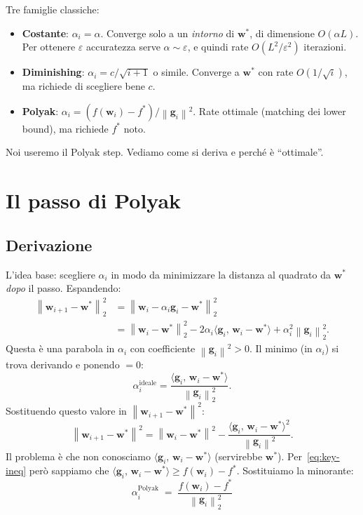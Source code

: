 \documentclass[11pt,a4paper]{article}
\newcommand{\norm}[1]{\left\|#1\right\|}
\newcommand{\inner}[2]{\langle #1,\,#2\rangle}
\newcommand{\bw}{\mathbf{w}}
\newcommand{\bg}{\mathbf{g}}
\theoremstyle{definition}
\begin{document}
Tre famiglie classiche:

\begin{itemize}[leftmargin=*]
\item \textbf{Costante}: $\alpha_i = \alpha$. Converge solo a un \emph{intorno} di $\bw^*$, di dimensione $O(\alpha L)$. Per ottenere $\varepsilon$ accuratezza serve $\alpha\sim\varepsilon$, e quindi rate $O(L^2/\varepsilon^2)$ iterazioni.
\item \textbf{Diminishing}: $\alpha_i = c/\sqrt{i+1}$ o simile. Converge a $\bw^*$ con rate $O(1/\sqrt{i})$, ma richiede di scegliere bene $c$.
\item \textbf{Polyak}: $\alpha_i = (f(\bw_i)-f^*)/\norm{\bg_i}^2$. Rate ottimale (matching dei lower bound), ma richiede $f^*$ noto.
\end{itemize}

Noi useremo il Polyak step. Vediamo come si deriva e perché è ``ottimale''.

\section{Il passo di Polyak}
\label{sec:polyak}

\subsection{Derivazione}

L'idea base: scegliere $\alpha_i$ in modo da minimizzare la distanza al quadrato da $\bw^*$ \emph{dopo} il passo. Espandendo:
\begin{align*}
\norm{\bw_{i+1}-\bw^*}_2^2 &= \norm{\bw_i - \alpha_i\bg_i - \bw^*}_2^2 \\
&= \norm{\bw_i-\bw^*}_2^2 - 2\alpha_i\inner{\bg_i}{\bw_i-\bw^*} + \alpha_i^2\norm{\bg_i}_2^2.
\end{align*}
Questa è una parabola in $\alpha_i$ con coefficiente $\norm{\bg_i}^2>0$. Il minimo (in $\alpha_i$) si trova derivando e ponendo $=0$:
\[
\alpha_i^{\text{ideale}} = \frac{\inner{\bg_i}{\bw_i-\bw^*}}{\norm{\bg_i}_2^2}.
\]
Sostituendo questo valore in $\norm{\bw_{i+1}-\bw^*}^2$:
\[
\norm{\bw_{i+1}-\bw^*}^2 = \norm{\bw_i-\bw^*}^2 - \frac{\inner{\bg_i}{\bw_i-\bw^*}^2}{\norm{\bg_i}^2}.
\]
Il problema è che non conosciamo $\inner{\bg_i}{\bw_i-\bw^*}$ (servirebbe $\bw^*$). Per~\eqref{eq:key-ineq} però sappiamo che $\inner{\bg_i}{\bw_i-\bw^*}\ge f(\bw_i)-f^*$. Sostituiamo la minorante:
\begin{equation}
\label{eq:polyak}
\boxed{\;\;\alpha_i^{\text{Polyak}} \;=\; \frac{f(\bw_i) - f^*}{\norm{\bg_i}_2^2}\;\;}
\end{equation}
\end{document}
